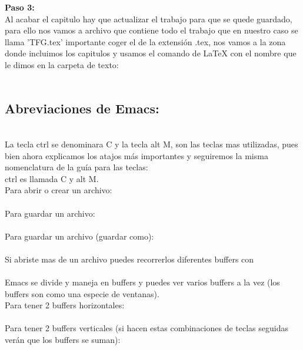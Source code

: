 \textbf{Paso 3:}\\
Al acabar el capitulo hay que actualizar el trabajo para que se quede guardado, para ello nos vamos a archivo que contiene todo el trabajo que en nuestro caso se llama 'TFG.tex' importante coger el de la extensión .tex, nos vamos a la zona donde incluimos los capitulos y usamos el comando de LaTeX con el nombre que le dimos en la carpeta de texto:\\

\\



\subsection{Abreviaciones de Emacs:}\\

La tecla ctrl se denominara C y la tecla alt M, son las teclas mas utilizadas, pues bien ahora explicamos los atajos más importantes y seguiremos la misma nomenclatura de la guía para las teclas:\\

ctrl es llamada C y alt M.\\

Para abrir o crear un archivo:\\
\\

Para guardar un archivo:\\
\\

Para guardar un archivo (guardar como):\\
\\

Si abriste mas de un archivo puedes recorrerlos diferentes buffers con\\
\\

Emacs se divide y maneja en buffers y puedes ver varios buffers a la vez (los buffers son como una especie de ventanas).\\

Para tener 2 buffers horizontales:\\
\\

Para tener 2 buffers verticales (si hacen estas combinaciones de teclas seguidas verán que los buffers se suman):\\
\\

